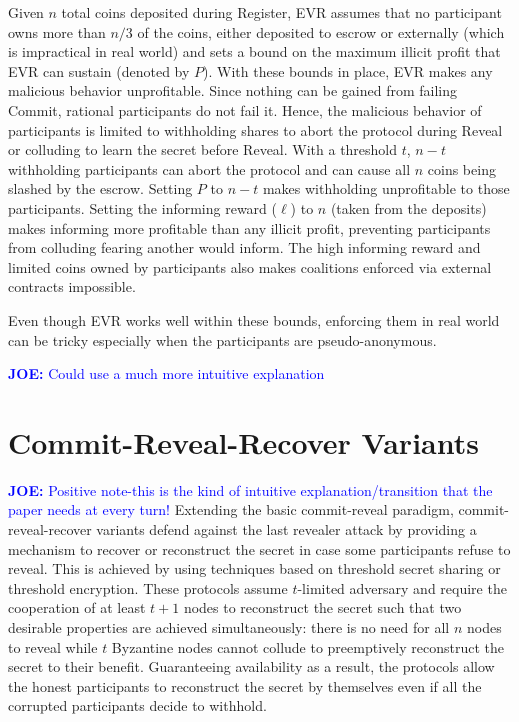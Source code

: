 \documentclass[letterpaper,twocolumn,10pt]{article}
\theoremstyle{definition}
\theoremstyle{remark}
\newcommand{\joenote}[1]{\textcolor{blue}{\textbf{JOE:} #1}}
\begin{document}
Given $n$ total coins deposited during Register, EVR assumes that no participant owns more than $n/3$ of the coins, either deposited to escrow or externally (which is impractical in real world) and sets a bound on the maximum illicit profit that EVR can sustain (denoted by $P$). With these bounds in place, EVR makes any malicious behavior unprofitable. Since nothing can be gained from failing Commit, rational participants do not fail it. Hence, the malicious behavior of participants is limited to withholding shares to abort the protocol during Reveal or colluding to learn the secret before Reveal. With a threshold $t$, $n-t$ withholding participants can abort the protocol and can cause all $n$ coins being slashed by the escrow. Setting $P$ to $n-t$ makes withholding unprofitable to those participants. Setting the informing reward ($\ell$) to $n$ (taken from the deposits) makes informing more profitable than any illicit profit, preventing participants from colluding fearing another would inform. The high informing reward and limited coins owned by participants also makes coalitions enforced via external contracts impossible.

Even though EVR works well within these bounds, enforcing them in real world can be tricky especially when the participants are pseudo-anonymous.

\joenote{Could use a much more intuitive explanation}

\section{Commit-Reveal-Recover Variants}
\label{section:commit-reveal-recover}
\joenote{Positive note-this is the kind of intuitive explanation/transition that the paper needs at every turn!}
Extending the basic commit-reveal paradigm, commit-reveal-recover variants defend against the last revealer attack by providing a mechanism to recover or reconstruct the secret in case some participants refuse to reveal. This is achieved by using techniques based on threshold secret sharing or threshold encryption. These protocols assume $t$-limited adversary and require the cooperation of at least $t + 1$ nodes to reconstruct the secret such that two desirable properties are achieved simultaneously: there is no need for all $n$ nodes to reveal while $t$ Byzantine nodes cannot collude to preemptively reconstruct the secret to their benefit. Guaranteeing availability as a result, the protocols allow the honest participants to reconstruct the secret by themselves even if all the corrupted participants decide to withhold.
\end{document}
